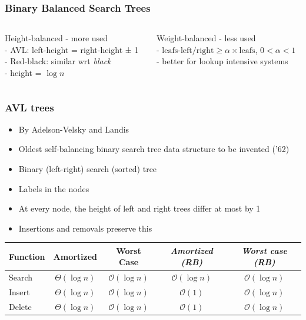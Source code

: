 \documentclass[aspectratio=169]{beamer}
\begin{document}
\begin{frame}\frametitle{Binary Balanced Search Trees}

  \begin{columns}[t]
  \begin{column}{0.48\textwidth}
    \begin{alertblock}{Height-balanced}
      - more used
      \\- AVL: left-height = right-height ± 1
      \\- Red-black: similar wrt \emph{black}
      \\- height = $\log n$
    \end{alertblock}      
  \end{column}    
  \begin{column}{0.48\textwidth}
    \begin{block}{Weight-balanced}
      - less used
      \\- $\text{leafs-left/right} \geq \alpha \times \text{leafs}$, $0<\alpha<1$
      \\- better for lookup intensive systems
    \end{block}      
  \end{column}    
  \end{columns} 
\end{frame}


\newcommand{\notyet}[1]{\textcolor{black!40}{\textit{#1}}}
\newcommand{\oknow}[1]{\alert{\textbf{\textit{#1}}}}

\begin{frame}\frametitle{AVL trees}
\centering

\begin{itemize}
  \item By Adelson-Velsky and Landis
  \item Oldest self-balancing binary search tree data structure to be invented ('62)
  \item Binary (left-right) search (sorted) tree
  \item Labels in the nodes
  \item At every node, the \alert{height of left and right trees differ at most by 1}
  \item Insertions and removals preserve this
\end{itemize}



\begin{tabular}{lcc@{~~~}cc}
\toprule
Function &  Amortized & Worst Case
 & \notyet{Amortized (RB)} & \notyet{Worst case (RB)}
\\\midrule
Search     & ${\Theta(\log n)}$ & ${\mathcal{O}(\log n)}$
           & \notyet{${\mathcal{O}(\log n)}$} & \notyet{${\mathcal{O}(\log n)}$}\\
Insert     & ${\Theta(\log n)}$ & ${\mathcal{O}(\log n)}$
           & \notyet{${\mathcal{O}(1)}$} & \notyet{${\mathcal{O}(\log n)}$}\\
Delete     & ${\Theta(\log n)}$ & ${\mathcal{O}(\log n)}$
           & \notyet{${\mathcal{O}(1)}$} & \notyet{${\mathcal{O}(\log n)}$}\\
\bottomrule
\end{tabular}
\end{frame}
\end{document}
